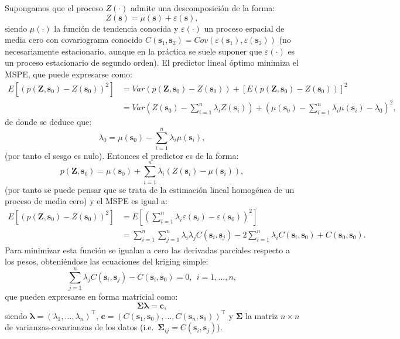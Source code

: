 \documentclass[
]{book}
\theoremstyle{break}
\theoremstyle{definition}
\theoremstyle{definition}
\theoremstyle{definition}
\theoremstyle{definition}
\theoremstyle{remark}
\begin{document}
Supongamos que el proceso \(Z(\cdot)\) admite una descomposición de la forma:
\[Z(\mathbf{s})=\mu(\mathbf{s})+\varepsilon(\mathbf{s}),\]
siendo \(\mu(\cdot)\) la función de tendencia conocida y \(\varepsilon(\cdot)\) un proceso espacial de media cero con covariograma conocido \(C(\mathbf{s}_{1}, \mathbf{s}_{2}) =Cov(\varepsilon(\mathbf{s}_{1}), \varepsilon(\mathbf{s}_{2}))\) (no necesariamente estacionario, aunque en la práctica se suele suponer que \(\varepsilon(\cdot)\) es un proceso estacionario de segundo orden).
El predictor lineal óptimo minimiza el MSPE, que puede expresarse como:
\[\begin{aligned}
E\left[ \left( p(\mathbf{Z},\mathbf{s}_{0}) - Z(\mathbf{s}_{0})\right)^2 \right]  
& = Var\left( p(\mathbf{Z},\mathbf{s}_{0}) - Z(\mathbf{s}_{0})\right) 
+ \left[ E\left( p(\mathbf{Z},\mathbf{s}_{0}) - Z(\mathbf{s}_{0})\right) \right]^{2}  \\
& = Var\left( Z(\mathbf{s}_{0})-\sum\limits_{i=1}^{n}\lambda_{i}
Z(\mathbf{s}_{i}) \right) +\left( \mu(\mathbf{s}_{0}
)-\sum\limits_{i=1}^{n}\lambda_{i} \mu(\mathbf{s}_{i}) -\lambda_{0}
\right)^{2},
\end{aligned}\]
de donde se deduce que:
\[\lambda_{0} =\mu(\mathbf{s}_{0})-\sum\limits_{i=1}^{n}\lambda_{i} \mu(\mathbf{s}_{i}),\]
(por tanto el sesgo es nulo).
Entonces el predictor es de la forma:
\[p(\mathbf{Z}, \mathbf{s}_{0}) = \mu(\mathbf{s}_{0}) + \sum\limits_{i=1}^{n}\lambda_{i} (Z(\mathbf{s}_{i}) -\mu(\mathbf{s}_{i})),\]
(por tanto se puede pensar que se trata de la estimación lineal homogénea de un proceso de media cero) y el MSPE es igual a:
\[\begin{aligned}
E\left[ \left( p(\mathbf{Z},\mathbf{s}_{0})-Z(\mathbf{s}_{0})\right)^2 \right]  & = E\left[ \left( \sum\limits_{i=1}^{n}\lambda_{i} \varepsilon(\mathbf{s}_{i}) -\varepsilon(\mathbf{s}_{0})\right)^2 \right]  \\
& = \sum\limits_{i=1}^{n}\sum\limits_{j=1}^{n}\lambda_{i} \lambda_{j}
C(\mathbf{s}_{i},\mathbf{s}_{j} ) -2 \sum\limits_{i=1}^{n}\lambda_{i}
C(\mathbf{s}_{i},\mathbf{s}_{0}) +C(\mathbf{s}_{0},\mathbf{s}_{0}).\end{aligned}\]
Para minimizar esta función se igualan a cero las derivadas parciales respecto a los pesos, obteniéndose las ecuaciones del kriging simple:
\[\sum\limits_{j=1}^{n}\lambda_{j} C(\mathbf{s}_{i},\mathbf{s}_{j} )
- C(\mathbf{s}_{i},\mathbf{s}_{0})=0, \ \
i=1, \ldots, n,\]
que pueden expresarse en forma matricial como:
\[\boldsymbol{\Sigma}\boldsymbol{\lambda}=\mathbf{c},\]
siendo \(\boldsymbol{\lambda} = \left(\lambda_{1}, \ldots, \lambda_{n}\right)^\top\), \(\mathbf{c}=\left( C(\mathbf{s}_{1},\mathbf{s}_{0}), \ldots,C(\mathbf{s}_{n}, \mathbf{s}_{0})\right)^\top\) y \(\boldsymbol{\Sigma}\) la matriz \(n\times n\) de varianzas-covarianzas de los datos (i.e.~\(\boldsymbol{\Sigma}_{ij} =C(\mathbf{s}_{i},\mathbf{s}_{j} )\)).
\end{document}
